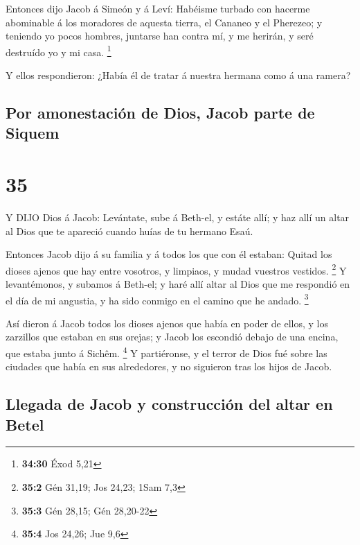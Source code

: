  Entonces dijo Jacob á Simeón y á Leví: Habéisme turbado
con hacerme abominable á los moradores de aquesta tierra, el Cananeo y
el Pherezeo; y teniendo yo pocos hombres, juntarse han contra mí, y me
herirán, y seré destruído yo y mi casa. \footnote{\textbf{34:30} Éxod
  5,21}

 Y ellos respondieron: ¿Había él de tratar á nuestra
hermana como á una ramera?

\hypertarget{por-amonestaciuxf3n-de-dios-jacob-parte-de-siquem}{%
\subsection{Por amonestación de Dios, Jacob parte de
Siquem}\label{por-amonestaciuxf3n-de-dios-jacob-parte-de-siquem}}

\hypertarget{section-34}{%
\section{35}\label{section-34}}

 Y DIJO Dios á Jacob: Levántate, sube á Beth-el, y estáte
allí; y haz allí un altar al Dios que te apareció cuando huías de tu
hermano Esaú.

 Entonces Jacob dijo á su familia y á todos los que con él
estaban: Quitad los dioses ajenos que hay entre vosotros, y limpiaos, y
mudad vuestros vestidos. \footnote{\textbf{35:2} Gén 31,19; Jos 24,23;
  1Sam 7,3}  Y levantémonos, y subamos á Beth-el; y haré
allí altar al Dios que me respondió en el día de mi angustia, y ha sido
conmigo en el camino que he andado. \footnote{\textbf{35:3} Gén 28,15;
  Gén 28,20-22}

 Así dieron á Jacob todos los dioses ajenos que había en
poder de ellos, y los zarzillos que estaban en sus orejas; y Jacob los
escondió debajo de una encina, que estaba junto á Sichêm. \footnote{\textbf{35:4}
  Jos 24,26; Jue 9,6}  Y partiéronse, y el terror de Dios
fué sobre las ciudades que había en sus alrededores, y no siguieron tras
los hijos de Jacob.

\hypertarget{llegada-de-jacob-y-construcciuxf3n-del-altar-en-betel}{%
\subsection{Llegada de Jacob y construcción del altar en
Betel}\label{llegada-de-jacob-y-construcciuxf3n-del-altar-en-betel}}

